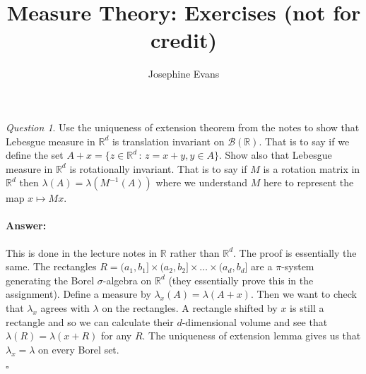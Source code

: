 \documentclass[11pt]{article}
\author{
Josephine Evans
}
\title{Measure Theory: Exercises (not for credit)}
\theoremstyle{definition}
\theoremstyle{remark}
\newtheorem{q}{Question}
\newenvironment{ans}{\paragraph{Answer:}}{\hfill$\square$}
\begin{document}
\maketitle

\begin{q}
Use the uniqueness of extension theorem from the notes to show that Lebesgue measure in $\mathbb{R}^d$ is translation invariant on $\mathcal{B}(\mathbb{R})$. That is to say if we define the set $A+x = \{z \in \mathbb{R}^d\,:\, z=x+y, y \in A \}$. Show also that Lebesgue measure in $\mathbb{R}^d$ is rotationally invariant. That is to say if $M$ is a rotation matrix in $\mathbb{R}^d$ then $\lambda(A) = \lambda(M^{-1}(A))$ where we understand $M$ here to represent the map $x \mapsto Mx$.
\end{q}
\begin{ans}
This is done in the lecture notes in $\mathbb{R}$ rather than $\mathbb{R}^d$. The proof is essentially the same. The rectangles $R= (a_1, b_1] \times (a_2, b_2] \times \dots \times (a_d, b_d]$ are a $\pi$-system generating the Borel $\sigma$-algebra on $\mathbb{R}^d$ (they essentially prove this in the assignment). Define a measure by $\lambda_x(A) = \lambda(A+x)$. Then we want to check that $\lambda_x$ agrees with $\lambda$ on the rectangles. A rectangle shifted by $x$ is still a rectangle and so we can calculate their $d$-dimensional volume and see that $\lambda(R) = \lambda(x +R)$ for any $R$. The uniqueness of extension lemma gives us that $\lambda_x = \lambda$ on every Borel set. 


\end{ans}
\end{document}
